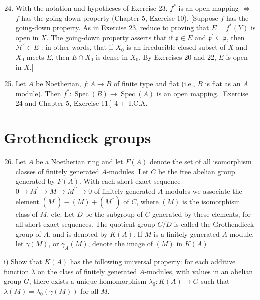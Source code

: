\documentclass{standalone}
\theoremstyle{definition}
\theoremstyle{remark}
\begin{document}
\begin{enumerate}
  \setcounter{enumi}{23}
  \item With the notation and hypotheses of Exercise 23, $f^{*}$ is an open mapping $\Leftrightarrow$ $f$ has the going-down property (Chapter 5, Exercise 10). [Suppose $f$ has the going-down property. As in Exercise 23, reduce to proving that $E=f^{*}(Y)$ is open in $X$. The going-down property asserts that if $\mathfrak{p} \in E$ and $\mathfrak{p}^{\prime} \subseteq \mathfrak{p}$, then $\mathcal{H}^{\prime} \in E$ : in other words, that if $X_{0}$ is an irreducible closed subset of $X$ and $X_{0}$ meets $E$, then $E \cap X_{0}$ is dense in $X_{0}$. By Exercises 20 and 22, $E$ is open in $X$.]

  \item Let $A$ be Noetherian, $f: A \rightarrow B$ of finite type and flat (i.e., $B$ is flat as an $A$ module). Then $f^{*}: \operatorname{Spec}(B) \rightarrow \operatorname{Spec}(A)$ is an open mapping. [Exercise 24 and Chapter 5, Exercise 11.] $4+$ I.C.A.

\end{enumerate}

\section{Grothendieck groups}
\begin{enumerate}
  \setcounter{enumi}{25}
  \item Let $A$ be a Noetherian ring and let $F(A)$ denote the set of all isomorphism classes of finitely generated $A$-modules. Let $C$ be the free abelian group generated by $F(A)$. With each short exact sequence $0 \rightarrow M^{\prime} \rightarrow M \rightarrow M^{\prime \prime} \rightarrow 0$ of finitely generated $A$-modules we associate the element $\left(M^{\prime}\right)-(M)+\left(M^{\prime \prime}\right)$ of $C$, where $(M)$ is the isomorphism class of $M$, etc. Let $D$ be the subgroup of $C$ generated by these elements, for all short exact sequences. The quotient group $C / D$ is called the Grothendieck group of $A$, and is denoted by $K(A)$. If $M$ is a finitely generated $A$-module, let $\gamma(M)$, or $\gamma_{A}(M)$, denote the image of $(M)$ in $K(A)$.
\end{enumerate}

i) Show that $K(A)$ has the following universal property: for each additive function $\lambda$ on the class of finitely generated $A$-modules, with values in an abelian group $G$, there exists a unique homomorphism $\lambda_{0}: K(A) \rightarrow G$ such that $\lambda(M)=\lambda_{0}(\gamma(M))$ for all $M$.
\end{document}
